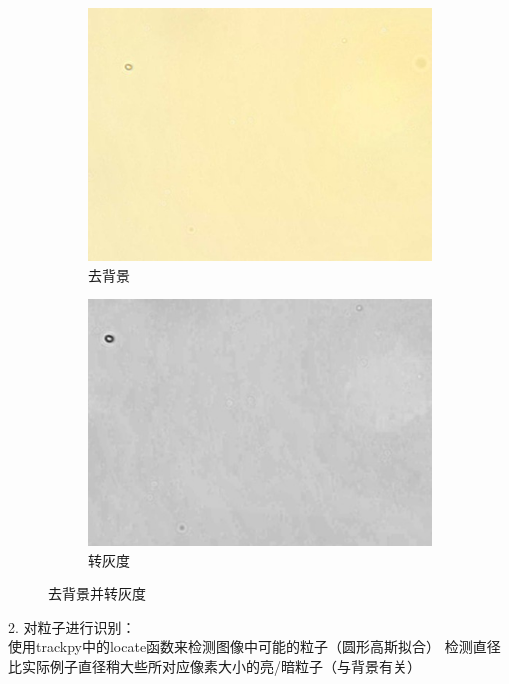 \documentclass[a4paper]{report} %
\begin{document}
\begin{figure}[H]
    \centering
    \begin{subfigure}{0.45\textwidth}
        \includegraphics[width=\linewidth]{去背景.jpg}
        \caption{去背景}
    \end{subfigure}
    \begin{subfigure}{0.45\textwidth}
        \includegraphics[width=\linewidth]{转灰度.jpg}
        \caption{转灰度}
    \end{subfigure}

    \caption{去背景并转灰度}
\end{figure}
2. 对粒子进行识别：\\
使用trackpy中的locate函数来检测图像中可能的粒子（圆形高斯拟合）
检测直径比实际例子直径稍大些所对应像素大小的亮/暗粒子（与背景有关）
\end{document}

